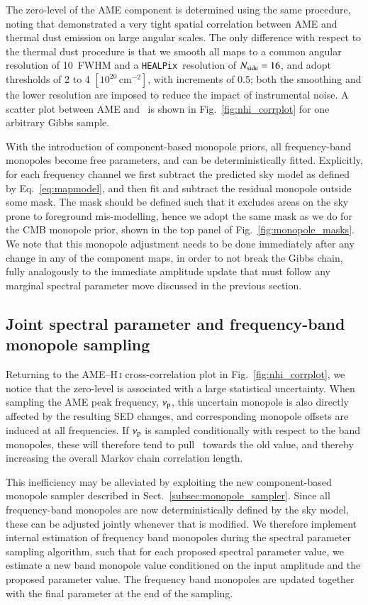 \documentclass[twocolumn]{aa}
\def\healpix{\texttt{HEALPix}}
\begin{document}
The zero-level of the AME component is determined using the same
procedure, noting that \citet{planck2014-a12} demonstrated a very
tight spatial correlation between AME and thermal dust emission on
large angular scales. The only difference with respect to the thermal
dust procedure is that we smooth all maps to a common angular
resolution of 10\deg\ FWHM and a \healpix\ resolution of $\nside=16$,
and adopt thresholds of 2 to 4 $[10^{20}\,\mathrm{cm}^{-2}]$, with
increments of 0.5; both the smoothing and the lower resolution
are imposed to reduce the impact of instrumental noise.
A scatter plot between AME and \NHI\ is shown in
Fig.~\ref{fig:nhi_corrplot} for one arbitrary Gibbs sample.

With the introduction of component-based monopole priors, all
frequency-band monopoles become free parameters, and can be
deterministically fitted. Explicitly, for each frequency channel we
first subtract the predicted sky model as defined by
Eq.~\eqref{eq:mapmodel}, and then fit and subtract the residual monopole
outside some mask. The mask should be defined such that it excludes
areas on the sky prone to foreground mis-modelling, hence we adopt the
same mask as we do for the CMB monopole prior, shown in the top panel
of Fig.~\ref{fig:monopole_masks}. We note that this monopole
adjustment needs to be done immediately after any change in any of
the component maps, in order to not break the Gibbs chain, fully
analogously to the immediate amplitude update that must follow any
marginal spectral parameter move discussed in the previous section.


\subsection{Joint spectral parameter and frequency-band monopole sampling} %
\label{subsec:monopole_index}
Returning to the AME--H\,\textsc i cross-correlation plot in
Fig.~\ref{fig:nhi_corrplot}, we notice that the zero-level is
associated with a large statistical uncertainty. When sampling the AME
peak frequency, $\nup$, this uncertain monopole is also directly
affected by the resulting SED changes, and corresponding monopole
offsets are induced at all frequencies. If $\nup$ is sampled
conditionally with respect to the band monopoles, these will therefore
tend to pull \nup\ towards the old value, and thereby increasing the
overall Markov chain correlation length.

This inefficiency may be alleviated by exploiting the new component-based
monopole sampler described in
Sect.~\ref{subsec:monopole_sampler}. Since all frequency-band
monopoles are now deterministically defined by the sky model, these
can be adjusted jointly whenever that is modified. We therefore
implement internal estimation of frequency band monopoles during the
spectral parameter sampling algorithm, such that for each proposed
spectral parameter value, we estimate a new band monopole value
conditioned on the input amplitude and the proposed parameter
value. The frequency band monopoles are updated together with the
final parameter at the end of the sampling.
\end{document}
